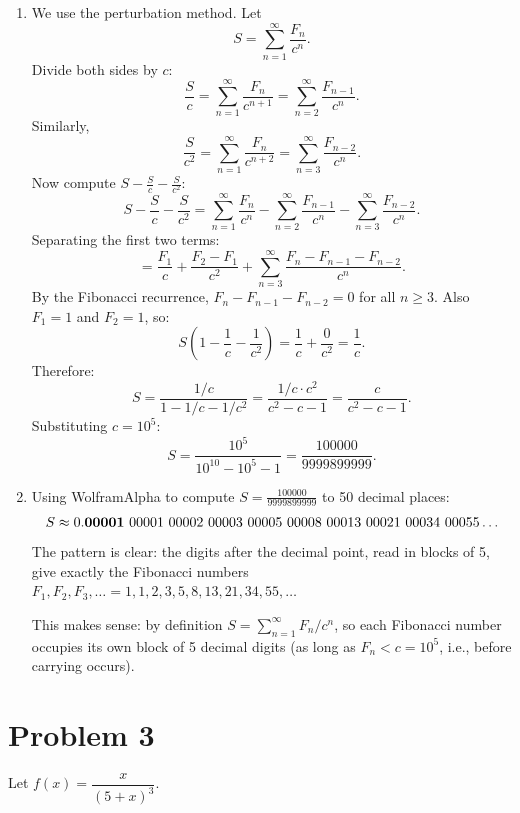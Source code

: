 \documentclass[11pt]{article}
\begin{document}
\begin{enumerate}[label=\textbf{(\alph*)}]

\item We use the perturbation method. Let
\[
    S = \sum_{n=1}^{\infty} \frac{F_n}{c^n}.
\]
Divide both sides by $c$:
\[
    \frac{S}{c} = \sum_{n=1}^{\infty} \frac{F_n}{c^{n+1}} = \sum_{n=2}^{\infty}
    \frac{F_{n-1}}{c^n}.
\]
Similarly,
\[
    \frac{S}{c^2} = \sum_{n=1}^{\infty} \frac{F_n}{c^{n+2}} = \sum_{n=3}^{\infty}
    \frac{F_{n-2}}{c^n}.
\]
Now compute $S - \frac{S}{c} - \frac{S}{c^2}$:
\[
    S - \frac{S}{c} - \frac{S}{c^2} = \sum_{n=1}^{\infty} \frac{F_n}{c^n} -
    \sum_{n=2}^{\infty} \frac{F_{n-1}}{c^n} - \sum_{n=3}^{\infty}
    \frac{F_{n-2}}{c^n}.
\]
Separating the first two terms:
\[
    = \frac{F_1}{c} + \frac{F_2 - F_1}{c^2} + \sum_{n=3}^{\infty}
    \frac{F_n - F_{n-1} - F_{n-2}}{c^n}.
\]
By the Fibonacci recurrence, $F_n - F_{n-1} - F_{n-2} = 0$ for all $n \geq 3$.
Also $F_1 = 1$ and $F_2 = 1$, so:
\[
    S\left(1 - \frac{1}{c} - \frac{1}{c^2}\right) = \frac{1}{c} + \frac{0}{c^2} =
    \frac{1}{c}.
\]
Therefore:
\[
    S = \frac{1/c}{1 - 1/c - 1/c^2} = \frac{1/c \cdot c^2}{c^2 - c - 1} =
    \frac{c}{c^2 - c - 1}.
\]
Substituting $c = 10^5$:
\[
    \boxed{S = \frac{10^5}{10^{10} - 10^5 - 1} = \frac{100000}{9999899999}.}
\]

\item Using WolframAlpha to compute $S = \frac{100000}{9999899999}$ to 50 decimal
places:
\[
    S \approx 0.{\bf 00001}\ 00001\ 00002\ 00003\ 00005\ 00008\ 00013\ 00021\ 00034\
    00055\ldots
\]
The pattern is clear: the digits after the decimal point, read in blocks of 5, give
exactly the Fibonacci numbers $F_1, F_2, F_3, \ldots = 1, 1, 2, 3, 5, 8, 13, 21,
34, 55, \ldots$

This makes sense: by definition $S = \sum_{n=1}^{\infty} F_n / c^n$, so each
Fibonacci number occupies its own block of 5 decimal digits (as long as $F_n < c =
10^5$, i.e., before carrying occurs).

\end{enumerate}

\section*{Problem 3}

Let $f(x) = \dfrac{x}{(5+x)^3}$.
\end{document}
